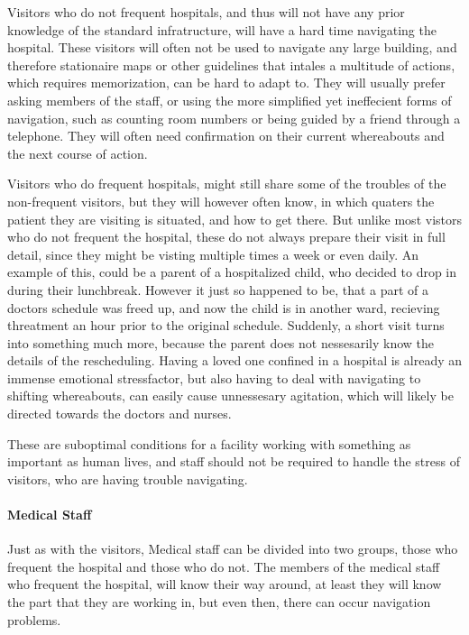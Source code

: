 Visitors who do not frequent hospitals, and thus will not have any prior knowledge of the standard infratructure, will have a hard time navigating the hospital. These visitors will often not be used to navigate any large building, and therefore stationaire maps or other guidelines that intales a multitude of actions, which requires memorization, can be hard to adapt to. They will usually prefer asking members of the staff, or using the more simplified yet ineffecient forms of navigation, such as counting room numbers or being guided by a friend through a telephone. They will often need confirmation on their current whereabouts and the next course of action.

Visitors who do frequent hospitals, might still share some of the troubles of the non-frequent visitors, but they will however often know, in which quaters the patient they are visiting is situated, and how to get there. But unlike most vistors who do not frequent the hospital, these do not always prepare their visit in full detail, since they might be visting multiple times a week or even daily. An example of this, could be a parent of a hospitalized child, who decided to drop in during their lunchbreak. However it just so happened to be, that a part of a doctors schedule was freed up, and now the child is in another ward, recieving threatment an hour prior to the original schedule. Suddenly, a short visit turns into something much more, because the parent does not nessesarily know the details of the rescheduling. Having a loved one confined in a hospital is already an immense emotional stressfactor, but also having to deal with navigating to shifting whereabouts, can easily cause unnessesary agitation, which will likely be directed towards the doctors and nurses.

These are suboptimal conditions for a facility working with something as important as human lives, and staff should not be required to handle the stress of visitors, who are having trouble navigating.

\paragraph{Medical Staff} %

Just as with the visitors, Medical staff can be divided into two groups, those who frequent the hospital and those who do not. The members of the medical staff who frequent the hospital, will know their way around, at least they will know the part that they are working in, but even then, there can occur navigation problems. 

